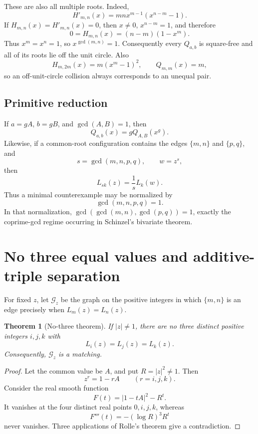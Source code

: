\documentclass[11pt]{article}
\newtheorem{theorem}{Theorem}[section]
\theoremstyle{definition}
\begin{document}
These are also all multiple roots.  Indeed,
\[
 H'_{m,n}(x)=mnx^{m-1}(x^{n-m}-1).
\]
If \(H_{m,n}(x)=H'_{m,n}(x)=0\), then \(x\neq0\),
\(x^{n-m}=1\), and therefore
\[
 0=H_{m,n}(x)=(n-m)(1-x^m).
\]
Thus \(x^m=x^n=1\), so \(x^{\gcd(m,n)}=1\).  Consequently every
\(Q_{a,b}\) is square-free and all of its roots lie off the unit circle.
Also
\[
 H_{m,2m}(x)=m(x^m-1)^2,\qquad Q_{m,m}(x)=m,
\]
so an off-unit-circle collision always corresponds to an unequal pair.

\subsection{Primitive reduction}

If \(a=gA\), \(b=gB\), and \(\gcd(A,B)=1\), then
\begin{equation}
 Q_{a,b}(x)=gQ_{A,B}(x^g).
 \tag{2.5}
\end{equation}
Likewise, if a common-root configuration contains the edges \(\{m,n\}\) and
\(\{p,q\}\), and
\[
 s=\gcd(m,n,p,q),\qquad w=z^s,
\]
then
\begin{equation}
 L_{sk}(z)=\frac1sL_k(w).
 \tag{2.6}
\end{equation}
Thus a minimal counterexample may be normalized by
\[
 \gcd(m,n,p,q)=1.
 \tag{2.7}
\]
In that normalization,
\(\gcd(\gcd(m,n),\gcd(p,q))=1\), exactly the coprime-gcd regime occurring in
Schinzel's bivariate theorem.

\section{No three equal values and additive-triple separation}

For fixed \(z\), let \(\mathcal G_z\) be the graph on the positive integers in
which \(\{m,n\}\) is an edge precisely when \(L_m(z)=L_n(z)\).

\begin{theorem}[No-three theorem]\label{thm:nothree}
If \(|z|\neq1\), there are no three distinct positive integers \(i,j,k\) with
\[
 L_i(z)=L_j(z)=L_k(z).
\]
Consequently, \(\mathcal G_z\) is a matching.
\end{theorem}

\begin{proof}
Let the common value be \(A\), and put \(R=|z|^2\neq1\).  Then
\[
 z^r=1-rA\qquad(r=i,j,k).
\]
Consider the real smooth function
\[
 F(t)=|1-tA|^2-R^t.
\]
It vanishes at the four distinct real points \(0,i,j,k\), whereas
\[
 F'''(t)=-(\log R)^3R^t
\]
never vanishes.  Three applications of Rolle's theorem give a contradiction.
\end{proof}
\end{document}

